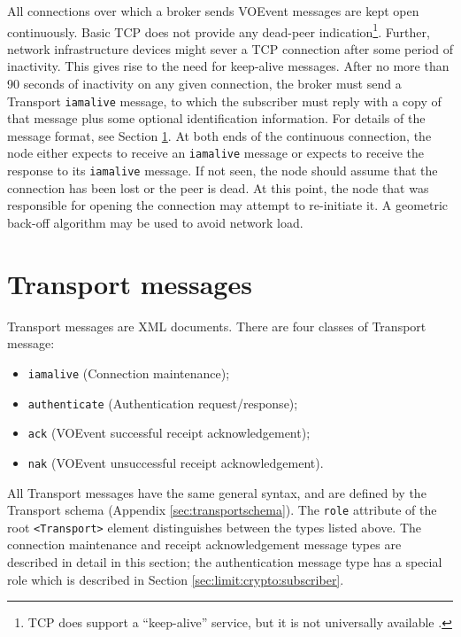 \documentclass[a4paper,11pt]{ivoa}
\begin{document}
All connections over which a broker sends VOEvent messages are kept open
continuously. Basic TCP does not provide any dead-peer indication\footnote{
TCP does support a ``keep-alive'' service, but it is not universally available
\citep{Braden:1989}.}. Further, network infrastructure devices might sever a
TCP connection after some period of inactivity. This gives rise to the need
for keep-alive messages. After no more than 90 seconds of inactivity on any
given connection, the broker must send a Transport \texttt{iamalive} message,
to which the subscriber must reply with a copy of that message plus some
optional identification information. For details of the message format, see
Section \ref{sec:transport}.  At both ends of the continuous connection, the
node either expects to receive an \texttt{iamalive} message or expects to
receive the response to its \texttt{iamalive} message. If not seen, the node
should assume that the connection has been lost or the peer is dead. At this
point, the node that was responsible for opening the connection may attempt to
re-initiate it. A geometric back-off algorithm may be used to avoid network
load.

\section{Transport messages}
\label{sec:transport}

Transport messages are XML documents. There are four classes of Transport
message:

\begin{itemize}
\item{\texttt{iamalive} (Connection maintenance);}
\item{\texttt{authenticate} (Authentication request/response);}
\item{\texttt{ack} (VOEvent successful receipt acknowledgement);}
\item{\texttt{nak} (VOEvent unsuccessful receipt acknowledgement).}
\end{itemize}

All Transport messages have the same general syntax, and are defined by the
Transport schema (Appendix \ref{sec:transportschema}). The \texttt{role}
attribute of the root \texttt{<Transport>} element distinguishes between the
types listed above. The connection maintenance and receipt acknowledgement
message types are described in detail in this section; the authentication
message type has a special role which is described in Section
\ref{sec:limit:crypto:subscriber}.
\end{document}
